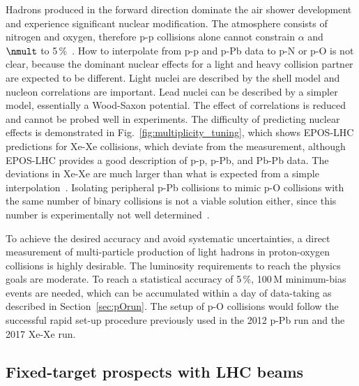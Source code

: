\documentclass[../report.tex]{subfiles}
\begin{document}
Hadrons produced in the forward direction dominate the air shower development and experience significant nuclear modification\cite{Aaij:2017cqq}. The atmosphere consists of nitrogen and oxygen, therefore p-p collisions alone cannot constrain $\alpha$ and $\nmult$ to 5\,\%~\cite{dEnterria:2018kcz}. How to interpolate from p-p and p-Pb data to p-N or p-O is not clear, because the dominant nuclear effects for a light and heavy collision partner are expected to be different. Light nuclei are described by the shell model and nucleon correlations are important. Lead nuclei can be described by a simpler model, essentially a Wood-Saxon potential. The effect of correlations is reduced and cannot be probed well in experiments.
The difficulty of predicting nuclear effects is demonstrated in Fig.~\ref{fig:multiplicity_tuning}, which shows EPOS-LHC predictions for Xe-Xe collisions, which deviate from the measurement, although EPOS-LHC provides a good description of p-p, p-Pb, and Pb-Pb data. The deviations in Xe-Xe are much larger than what is expected from a simple interpolation~\cite{Kim:2018ink}. Isolating peripheral p-Pb collisions to mimic p-O collisions with the same number of binary collisions is not a viable solution either, since this number is experimentally not well determined~\cite{Toia:2014wia}.

To achieve the desired accuracy and avoid systematic uncertainties, a direct measurement of multi-particle production of light hadrons in proton-oxygen collisions is highly desirable. The luminosity requirements to reach the physics goals are moderate. To reach a statistical accuracy of 5\,\%, 100\,M minimum-bias events are needed, which can be accumulated within a day of data-taking as described in Section~\ref{sec:pOrun}. The setup of p-O collisions would follow the successful rapid set-up procedure previously used in the 2012 p-Pb run and the 2017 Xe-Xe run.




\subsection{Fixed-target prospects with LHC beams}
\label{sec:fixedtarget}
\end{document}
